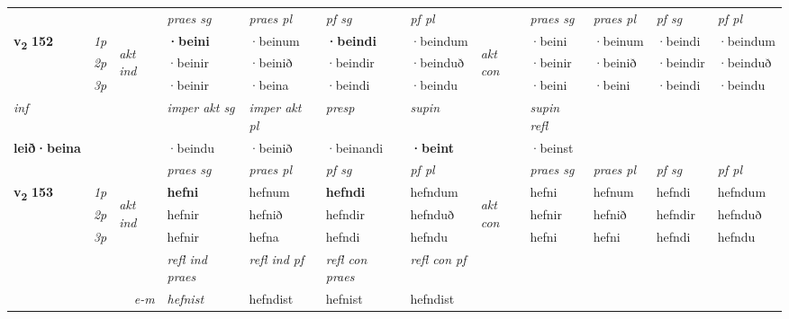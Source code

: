 \begin{longtable}[l]{X>{\footnotesize\itshape}llXXXXlXXXX}
 & &   & \textit{praes sg}  & \textit{praes pl}    & \textit{ pf sg} & \textit{pf pl} & & \textit{praes sg}  & \textit{praes pl}    & \textit{pf sg} & \textit{pf pl }  \\ \cmidrule{4-7} \cmidrule{9-12}
 \multirow{2}{*}{{{\textbf{v{\textsubscript{2}}} \Large{\textbf{152}}}}}  & 1p & \multirow{3}{*}{\begin{turn}{90}\textit{akt ind}\end{turn}} & \textbf{·beini} & ·beinum & \textbf{·beindi} & ·beindum & \multirow{3}{*}{\begin{turn}{90}\textit{akt con}\end{turn}} &·beini & ·beinum & ·beindi & ·beindum\\*
 & 2p &  &  ·beinir  & ·beinið & ·beindir & ·beinduð & & ·beinir & ·beinið & ·beindir & ·beinduð \\*
 & 3p &  & ·beinir & ·beina & ·beindi & ·beindu & & ·beini & ·beini& ·beindi & ·beindu \\*
\cmidrule{4-7} \cmidrule{9-12}

   {\textit{inf}} & &  & \textit{imper akt sg} & \textit{imper akt pl}   & \textit{presp} & \textit{supin} && \textit{supin refl}  \\*
  {\textbf{leið\allowbreak ·beina}} & && ·beindu  & ·beinið   & ·beinandi &  \textbf{·beint} && ·beinst  \\*

\midrule

 & &   & \textit{praes sg}  & \textit{praes pl}    & \textit{ pf sg} & \textit{pf pl} & & \textit{praes sg}  & \textit{praes pl}    & \textit{pf sg} & \textit{pf pl }  \\ \cmidrule{4-7} \cmidrule{9-12}
 \multirow{2}{*}{{{\textbf{v{\textsubscript{2}}} \Large{\textbf{153}}}}}  & 1p & \multirow{3}{*}{\begin{turn}{90}\textit{akt ind}\end{turn}} & \textbf{hefni} & hefnum & \textbf{hefndi} & hefndum & \multirow{3}{*}{\begin{turn}{90}\textit{akt con}\end{turn}} &hefni & hefnum & hefndi & hefndum\\*
 & 2p &  &  hefnir  & hefnið & hefndir & hefnduð & & hefnir & hefnið & hefndir & hefnduð \\*
 & 3p &  & hefnir & hefna & hefndi & hefndu & & hefni & hefni& hefndi & hefndu \\*
\cmidrule{4-7} \cmidrule{9-12}

 & && \textit{refl ind praes} & \textit{refl ind pf} & \textit{refl con praes} & \textit{refl con pf} \\*
\multicolumn{3}{r}{\textit{e-m}}& hefnist & hefndist & hefnist & hefndist \\*


\end{longtable}
